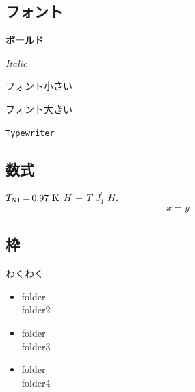 \documentclass[11pt,a4paper, titlepage]{ltjsarticle}
\let\origsubsection\subsection
\renewcommand{\section}{\origsubsection}
\renewcommand{\subsection}{\subsubsection}
\newcommand{\記}{\begin{center} 記 \end{center}}
\newcommand{\挨拶}{\noindent 拝啓 \ifcase\month\or 厳寒\or 春寒\or 早春
    \or 陽寒\or 新緑\or 向暑\or 猛暑\or 残暑\or 初秋\or 仲秋\or 晩秋\or 初冬
    \fi の候, ますますご清栄のこととお喜び申し上げます.}
\newcommand{\myeq}[2]{\begin{eqnarray}#1\label{eq:#2}\end{eqnarray}}
\begin{document}
\section{フォント}
\textbf{ボールド} \par
\textit{Italic} \par
\small{フォント小さい} \par
\large{フォント大きい} \par
{} \par
\texttt{Typewriter} \par
{} \par
{} \par


\section{数式}
$T_{\rm N1}\,{=}\,0.97~{\rm K}$
$H\,{-}\,T$
$J_1^{\prime}$
$H_{\rm s}$
\myeq{x=y}{1}
\section{枠}
\begin{tcolorbox}[colframe=black, colback=white,
        colbacktitle=blue, coltitle=white,
        fonttitle=\bfseries\sffamily,title=
        純粋な枠]
    わくわく
\end{tcolorbox}

\begin{breakbox}
    \begin{itemize}
        \item folder\\folder2
        \item folder\\folder3
        \item folder\\folder4
    \end{itemize}
\end{breakbox}
\end{document}
